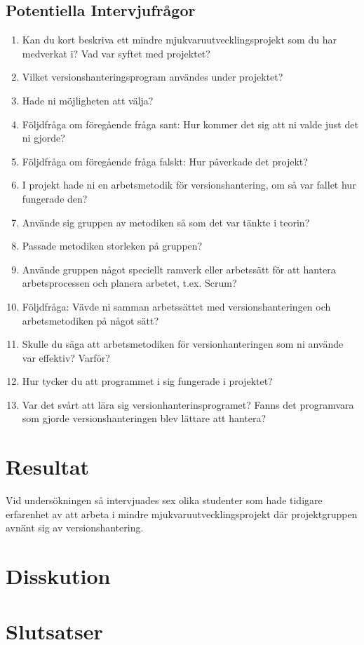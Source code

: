 \subsection{ Potentiella Intervjufrågor } \vspace{1em}
\begin{enumerate}

  \item Kan du kort beskriva ett mindre mjukvaruutvecklingsprojekt som du har medverkat i? Vad var syftet med projektet?

  \item Vilket versionshanteringsprogram användes under projektet?

  \item Hade ni möjligheten att välja?

  \item Följdfråga om föregående fråga sant: Hur kommer det sig att ni valde just det ni gjorde?
  \item Följdfråga om föregående fråga falskt: Hur påverkade det projekt?

  \item I projekt hade ni en arbetsmetodik för versionshantering, om så var fallet hur fungerade den?

  \item Använde sig gruppen av metodiken så som det var tänkte i teorin?

  \item Passade metodiken storleken på gruppen?

  \item Använde gruppen något speciellt ramverk eller arbetssätt för att hantera arbetsprocessen och planera arbetet, t.ex. Scrum?

  \item Följdfråga: Vävde ni samman arbetssättet med versionshanteringen och arbetsmetodiken på något sätt?

  \item Skulle du säga att arbetsmetodiken för versionhanteringen som ni använde var effektiv? Varför?

  \item Hur tycker du att programmet i sig fungerade i projektet?
  \item Var det svårt att lära sig versionhanterinsprogramet? Fanns det programvara som gjorde versionshanteringen blev lättare att hantera?

\end{enumerate}

\vspace{1.5em}
\section{Resultat}
Vid undersökningen så intervjuades sex olika studenter som hade tidigare erfarenhet av att arbeta i mindre mjukvaruutvecklingsprojekt där projektgruppen avnänt sig av versionshantering.

\vspace{1.5em}
\section{Disskution}


\vspace{1.5em}
\section{Slutsatser}
